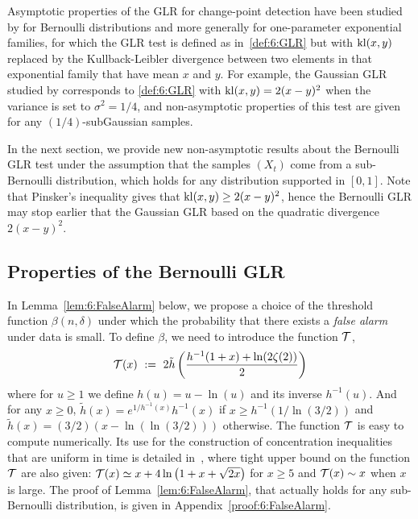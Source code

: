 Asymptotic properties of the GLR for change-point detection have been studied by \cite{LaiXing10} for Bernoulli distributions and more generally for one-parameter exponential families, for which the GLR test is defined as in~\eqref{def:6:GLR} but with $\mathrm{kl}(x,y)$ replaced by the Kullback-Leibler divergence between two elements in that exponential family that have mean $x$ and $y$. For example, the Gaussian GLR studied by \cite{Maillard2018GLR} corresponds to \eqref{def:6:GLR} with $\mathrm{kl}(x,y) = 2(x-y)^2$ when the variance is set to $\sigma^2=1/4$, and non-asymptotic properties of this test are given for any $(1/4)$-subGaussian samples.

In the next section, we provide new non-asymptotic results about the Bernoulli GLR test under the assumption that the samples $(X_t)$ come from a sub-Bernoulli distribution, which holds for any distribution supported in $[0,1]$.
Note that Pinsker's inequality gives that $\mathrm{kl}(x,y) \geq 2(x-y)^2$, hence the Bernoulli GLR may stop earlier that the Gaussian GLR based on the quadratic divergence $2(x-y)^2$.

\subsection{Properties of the Bernoulli GLR}\label{subsec:6:PropGLR}

In Lemma~\ref{lem:6:FalseAlarm} below, we propose a choice of the threshold function $\beta(n,\delta)$ under which the probability that there exists a \emph{false alarm} under \iid{} data is small. To define $\beta$, we need to introduce the function $\mathcal{T}$,
\begin{equation}\label{def:6:function_T}
    \mathcal{T}(x) ~:=~ 2 \tilde h\left(\frac{h^{-1}(1+x) + \ln(2\zeta(2))}{2}\right)
\end{equation}
where for $u \ge 1$ we define $h(u) = u - \ln(u)$ and its inverse $h^{-1}(u)$.
And for any $x \ge 0$, $\tilde h(x) = e^{1/h^{-1}(x)} h^{-1}(x)$ if $x \ge h^{-1}(1/\ln (3/2))$ and $\tilde{h}(x) = (3/2) (x-\ln(\ln (3/2)))$ otherwise. The function $\mathcal{T}$ is easy to compute numerically.
Its use for the construction of concentration inequalities that are uniform in time is detailed in~\cite{KK18Martingales}, where tight upper bound on the function $\mathcal{T}$ are also given:  $\mathcal{T} (x) \simeq x + 4 \ln\big(1 + x + \sqrt{2x}\big)$ for $x\geq 5$ and $\mathcal{T}(x) \sim x$ when $x$ is large. The proof of Lemma~\ref{lem:6:FalseAlarm}, that actually holds for any sub-Bernoulli distribution, is given in Appendix~\ref{proof:6:FalseAlarm}.


